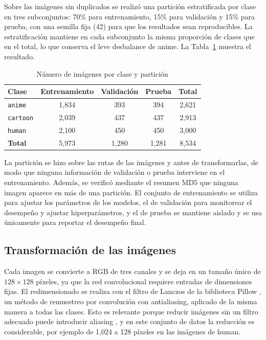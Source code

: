 \documentclass[letterpaper, 10 pt]{IEEEconf}
\begin{document}
Sobre las imágenes sin duplicados se realizó una partición estratificada por clase en tres subconjuntos: 70\% para entrenamiento, 15\% para validación y 15\% para prueba, con una semilla fija (42) para que los resultados sean reproducibles. La estratificación mantiene en cada subconjunto la misma proporción de clases que en el total, lo que conserva el leve desbalance de anime. La Tabla~\ref{tab:particion} muestra el resultado.

\begin{table}[H]
\caption{Número de imágenes por clase y partición}
\label{tab:particion}
\centering
\footnotesize
\begin{tabular}{lcccc}
\hline
\textbf{Clase} & \textbf{Entrenamiento} & \textbf{Validación} & \textbf{Prueba} & \textbf{Total} \\
\hline
\texttt{anime}   & 1,834 & 393   & 394   & 2,621 \\
\texttt{cartoon} & 2,039 & 437   & 437   & 2,913 \\
\texttt{human}   & 2,100 & 450   & 450   & 3,000 \\
\hline
\textbf{Total}   & 5,973 & 1,280 & 1,281 & 8,534 \\
\hline
\end{tabular}
\end{table}

La partición se hizo sobre las rutas de las imágenes y antes de transformarlas, de modo que ninguna información de validación o prueba interviene en el entrenamiento. Además, se verificó mediante el resumen MD5 que ninguna imagen aparece en más de una partición. El conjunto de entrenamiento se utiliza para ajustar los parámetros de los modelos, el de validación para monitorear el desempeño y ajustar hiperparámetros, y el de prueba se mantiene aislado y se usa únicamente para reportar el desempeño final.

\subsection{Transformación de las imágenes}

Cada imagen se convierte a RGB de tres canales y se deja en un tamaño único de $128 \times 128$ píxeles, ya que la red convolucional requiere entradas de dimensiones fijas. El redimensionado se realiza con el filtro de Lanczos de la biblioteca Pillow \cite{pillow}, un método de remuestreo por convolución con antialiasing, aplicado de la misma manera a todas las clases. Esto es relevante porque reducir imágenes sin un filtro adecuado puede introducir aliasing \cite{aliasing}, y en este conjunto de datos la reducción es considerable, por ejemplo de 1,024 a 128 píxeles en las imágenes de human.
\end{document}
